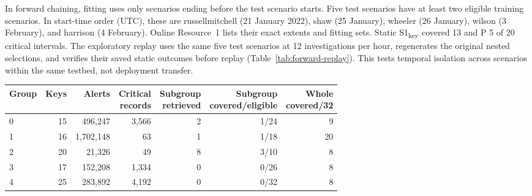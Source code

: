 \documentclass[pdflatex,sn-basic,Numbered]{sn-jnl}
\newcommand{\ForwardSOneKey}{13}
\newcommand{\ForwardP}{5}
\newcommand{\key}{\textsubscript{key}}
\begin{document}
In forward chaining, fitting uses only scenarios ending before the test scenario starts. Five test scenarios have at least two eligible training scenarios. In start-time order (UTC), these are russellmitchell (21 January 2022), shaw (25 January), wheeler (26 January), wilson (3 February), and harrison (4 February). Online Resource~1 lists their exact extents and fitting sets. Static S1\key{} covered \ForwardSOneKey{} and P \ForwardP{} of 20 critical intervals. The exploratory replay uses the same five test scenarios at 12 investigations per hour, regenerates the original nested selections, and verifies their saved static outcomes before replay (Table~\ref{tab:forward-replay}). This tests temporal isolation across scenarios within the same testbed, not deployment transfer.

\begin{tableorg}[t]
\centering
\caption{Identifier hold-out support and S1\key{} outcomes. Alerts and critical records are summed across scenarios. Eligible intervals contain at least one record from the withheld group. Subgroup covered counts only selected top-100 records from that group; whole coverage includes all identifiers.}
\label{tab:holdout-support}
\small
\begin{tabular}{lrrrrrr}
\toprule
Group & Keys & Alerts & \shortstack{Critical\\records} & \shortstack{Subgroup\\retrieved} & \shortstack{Subgroup\\covered/eligible} & \shortstack{Whole\\covered/32} \\
\midrule
0 & 15 & 496,247 & 3,566 & 2 & 1/24 & 9 \\
1 & 16 & 1,702,148 & 63 & 1 & 1/18 & 20 \\
2 & 20 & 21,326 & 49 & 8 & 3/10 & 8 \\
3 & 17 & 152,208 & 1,334 & 0 & 0/26 & 8 \\
4 & 25 & 283,892 & 4,192 & 0 & 0/32 & 8 \\
\bottomrule
\end{tabular}
\unskip
\end{tableorg}
\end{document}
